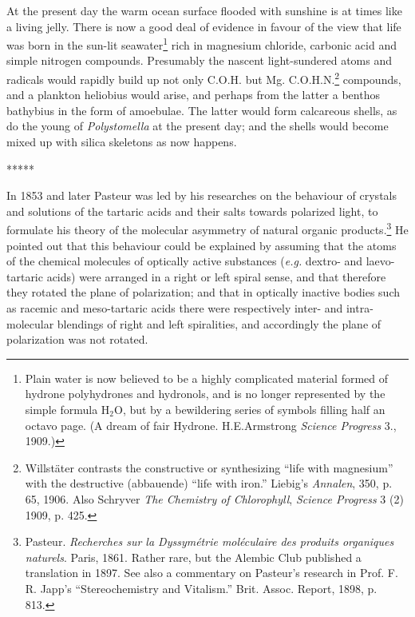 \documentclass[a4paper, 12pt, oneside]{article}
\begin{document}
At the present day the warm ocean surface flooded with sunshine is at times like a living jelly. There is now a good deal of evidence in favour of the view that life was born in the sun-lit seawater\footnote{Plain water is now believed to be a highly complicated material formed of hydrone polyhydrones and hydronols, and is no longer represented by the simple formula H$_{2}$O, but by a bewildering series of symbols filling half an octavo page. (A dream of fair Hydrone. H.E.Armstrong \emph{Science Progress} 3., 1909.)} rich in magnesium chloride, carbonic acid and simple nitrogen compounds. Presumably the nascent light-sundered atoms and radicals would rapidly build up not only C.O.H. but Mg. C.O.H.N.\footnote{Willstäter contrasts the constructive or synthesizing ``life with magnesium'' with the destructive (abbauende) ``life with iron.'' Liebig's \emph{Annalen}, 350, p. 65, 1906. Also Schryver \emph{The Chemistry of Chlorophyll}, \emph{Science Progress} 3 (2) 1909, p. 425.} compounds, and a plankton heliobius would arise, and perhaps from the latter a benthos bathybius in the form of amoebulae. The latter would form calcareous shells, as do the young of \emph{Polystomella} at the present day; and the shells would become mixed up with silica skeletons as now happens.

\centerline{*\hspace{15mm}*\hspace{15mm}*\hspace{15mm}*\hspace{15mm}*}
\bigskip

In 1853 and later Pasteur was led by his researches on the behaviour of crystals and solutions of the tartaric acids and their salts towards polarized light, to formulate his theory of the molecular asymmetry of natural organic products.\footnote{Pasteur. \emph{Recherches sur la Dyssymétrie moléculaire des produits organiques naturels}. Paris, 1861. Rather rare, but the Alembic Club published a translation in 1897. See also a commentary on Pasteur's research in Prof. F. R. Japp's ``Stereochemistry and Vitalism.'' Brit. Assoc. Report, 1898, p. 813.} He pointed out that this behaviour could be explained by assuming that the atoms of the chemical molecules of optically active substances (\emph{e.g.} dextro- and laevo-tartaric acids) were arranged in a right or left spiral sense, and that therefore they rotated the plane of polarization; and that in optically inactive bodies such as racemic and meso-tartaric acids there were respectively inter- and intra-molecular blendings of right and left spiralities, and accordingly the plane of polarization was not rotated.
\end{document}
